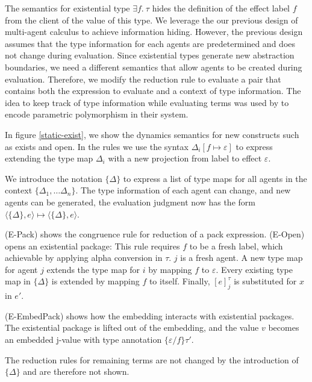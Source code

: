 The semantics for existential type $\exists f.\ \tau$  hides the definition of the effect label $f$ from the client of the value of this type. We leverage the our previous design of multi-agent calculus to achieve information hiding. However, the previous design assumes that the type information for each agents are predetermined and does not change during evaluation. Since existential types generate new abstraction boundaries, we need a different semantics that allow agents to be created during evaluation. Therefore, we modify the reduction rule to evaluate a pair that contains both the expression to evaluate and a context of type information. The idea to keep track of type information while evaluating terms was used by \citet{grossman00} to encode parametric polymorphism in their system.

In figure \ref{static-exist}, we show the dynamics semantics for new constructs such as exists and open. In the rules we use the syntax $\Delta_i[f \mapsto \varepsilon]$ to express extending the type map $\Delta_i$ with a new projection from label  to effect $\varepsilon$.

We introduce the notation $\{\Delta\}$ to express a list of type maps for all agents in the context $\{\Delta_1, \dots \Delta_n\}$. The type information of each agent can change, and new agents can be generated, the evaluation judgment now has the form $\langle \{\Delta\}, e \rangle \mapsto \langle \{\Delta\}, e \rangle$. 

(E-Pack) shows the congruence rule for reduction of a pack expression. (E-Open) opens an existential package: This rule requires $f$ to be a fresh label, which achievable by applying alpha conversion in $\tau$. $j$ is a fresh agent. A new type map for agent $j$ extends the type map for $i$ by mapping $f$ to $\varepsilon$. Every existing type map in $\{\Delta\}$ is extended by mapping $f$ to itself. Finally, $[e]^\tau_j$ is substituted for $x$ in $e'$.

(E-EmbedPack) shows how the embedding interacts with existential packages. The existential package is lifted out of the embedding, and the value $v$ becomes an embedded j-value with type annotation $\{\varepsilon/f\}\tau'$.

The reduction rules for remaining terms are not changed by the introduction of $\{\Delta\}$ and are therefore not shown. 

